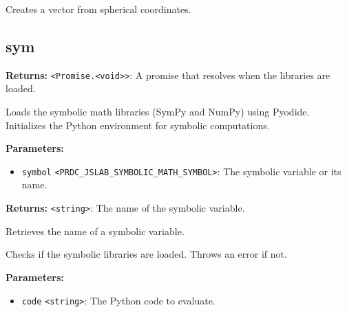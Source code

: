 \documentclass[12pt,a4paper]{article}
\begin{document}
\noindent Creates a vector from spherical coordinates.


\subsection{sym}
\vspace{5mm}
\noindent {}


\noindent \textbf{Returns:} \texttt{<Promise.<void>>}: A promise that resolves when the libraries are loaded.

\noindent Loads the symbolic math libraries (SymPy and NumPy) using Pyodide.
Initializes the Python environment for symbolic computations.

\vspace{5mm}
\noindent {}


\noindent \textbf{Parameters:}
\begin{itemize}
  \item \texttt{symbol} \texttt{<PRDC\_JSLAB\_SYMBOLIC\_MATH\_SYMBOL>}: The symbolic variable or its name.
\end{itemize}

\noindent \textbf{Returns:} \texttt{<string>}: The name of the symbolic variable.

\noindent Retrieves the name of a symbolic variable.

\vspace{5mm}
\noindent {}


\noindent Checks if the symbolic libraries are loaded. Throws an error if not.

\vspace{5mm}
\noindent {}


\noindent \textbf{Parameters:}
\begin{itemize}
  \item \texttt{code} \texttt{<string>}: The Python code to evaluate.
\end{itemize}
\end{document}
